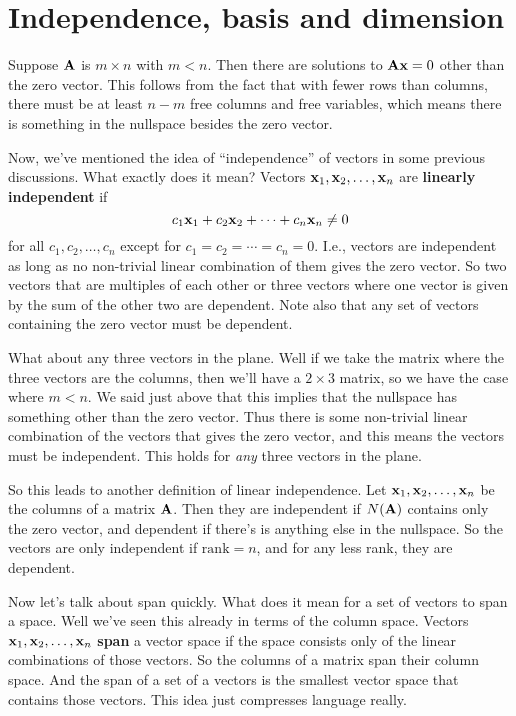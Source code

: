 \section{Independence, basis and dimension}

Suppose $\boldsymbol{\mathbf{A}}$ is $m \times n$ with $m < n$. Then there are solutions to $\boldsymbol{\mathbf{A}}\boldsymbol{\mathbf{x}} = 0$ other than the zero vector. This follows from the fact that with fewer rows than columns, there must be at least $n-m$ free columns and free variables, which means there is something in the nullspace besides the zero vector. 


Now, we've mentioned the idea of ``independence'' of vectors in some previous discussions. What exactly does it mean?
\bdf
Vectors $\boldsymbol{\mathbf{x}}_1,\boldsymbol{\mathbf{x}}_2,\ldots,\boldsymbol{\mathbf{x}}_n$ are \textbf{linearly independent} if 
\[ c_1\boldsymbol{\mathbf{x}}_1 + c_2\boldsymbol{\mathbf{x}}_2 + \cdots + c_n\boldsymbol{\mathbf{x}}_n \ne 0\]
for all $c_1,c_2,\ldots,c_n$ except for $c_1=c_2=\cdots=c_n=0$.
\edf
I.e., vectors are independent as long as no non-trivial linear combination of them gives the zero vector. So two vectors that are multiples of each other or three vectors where one vector is given by the sum of the other two are dependent. Note also that any set of vectors containing the zero vector must be dependent. 

What about any three vectors in the plane. Well if we take the matrix where the three vectors are the columns, then we'll have a $2 \times 3$ matrix, so we have the case where $m < n$. We said just above that this implies that the nullspace has something other than the zero vector. Thus there is some non-trivial linear combination of the vectors that gives the zero vector, and this means the vectors must be independent. This holds for \textit{any} three vectors in the plane. 

So this leads to another definition of linear independence. 
\bdf
Let $\boldsymbol{\mathbf{x}}_1,\boldsymbol{\mathbf{x}}_2,\ldots,\boldsymbol{\mathbf{x}}_n$ be the columns of a matrix $\boldsymbol{\mathbf{A}}$. Then they are independent if $N(\boldsymbol{\mathbf{A}})$ contains only the zero vector, and dependent if there's is anything else in the nullspace. So the vectors are only independent if $\mathrm{rank} = n$, and for any less rank, they are dependent. 
\edf

Now let's talk about span quickly. What does it mean for a set of vectors to span a space. Well we've seen this already in terms of the column space. 
\bdf
Vectors $\boldsymbol{\mathbf{x}}_1,\boldsymbol{\mathbf{x}}_2,\ldots,\boldsymbol{\mathbf{x}}_n$ \textbf{span} a vector space if the space consists only of the linear combinations of those vectors.
\edf
So the columns of a matrix span their column space. And the span of a set of a vectors is the smallest vector space that contains those vectors. This idea just compresses language really. 

